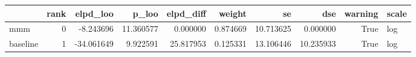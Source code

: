 \begin{tabular}{lrrrrrrrrl}
\toprule
 & rank & elpd_loo & p_loo & elpd_diff & weight & se & dse & warning & scale \\
\midrule
mmm & 0 & -8.243696 & 11.360577 & 0.000000 & 0.874669 & 10.713625 & 0.000000 & True & log \\
baseline & 1 & -34.061649 & 9.922591 & 25.817953 & 0.125331 & 13.106446 & 10.235933 & True & log \\
\bottomrule
\end{tabular}

